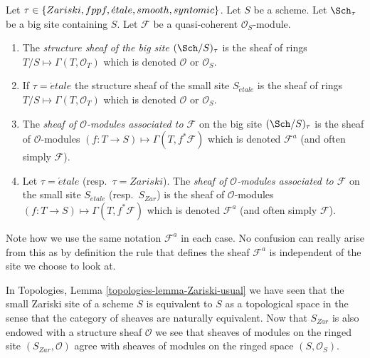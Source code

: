 \begin{definition}
\label{definition-structure-sheaf}
Let $\tau \in \{Zariski, \linebreak[0] fppf, \linebreak[0]
\acute{e}tale, \linebreak[0] smooth, \linebreak[0] syntomic\}$.
Let $S$ be a scheme.
Let $\Sch_\tau$ be a big site containing $S$.
Let $\mathcal{F}$ be a quasi-coherent $\mathcal{O}_S$-module.
\begin{enumerate}
\item The {\it structure sheaf of the big site $(\Sch/S)_\tau$}
is the sheaf of rings $T/S \mapsto \Gamma(T, \mathcal{O}_T)$ which is
denoted $\mathcal{O}$ or $\mathcal{O}_S$.
\item If $\tau = \acute{e}tale$ the structure sheaf of the small site
$S_{\acute{e}tale}$ is the sheaf of rings $T/S \mapsto \Gamma(T, \mathcal{O}_T)$
which is denoted $\mathcal{O}$ or $\mathcal{O}_S$.
\item The {\it sheaf of $\mathcal{O}$-modules associated to
$\mathcal{F}$} on the big site $(\Sch/S)_\tau$
is the sheaf of $\mathcal{O}$-modules
$(f : T \to S) \mapsto \Gamma(T, f^*\mathcal{F})$
which is denoted $\mathcal{F}^a$ (and often simply $\mathcal{F}$).
\item Let $\tau = \acute{e}tale$ (resp.\ $\tau = Zariski$). The
{\it sheaf of $\mathcal{O}$-modules associated to $\mathcal{F}$}
on the small site $S_{\acute{e}tale}$ (resp.\ $S_{Zar}$) is the sheaf of
$\mathcal{O}$-modules $(f : T \to S) \mapsto \Gamma(T, f^*\mathcal{F})$
which is denoted $\mathcal{F}^a$ (and often simply $\mathcal{F}$).
\end{enumerate}
\end{definition}

\noindent
Note how we use the same notation $\mathcal{F}^a$ in each case.
No confusion can really arise from this as by definition the rule
that defines the sheaf $\mathcal{F}^a$ is independent of the site
we choose to look at.

\begin{remark}
\label{remark-Zarsiki-site-space}
In Topologies, Lemma \ref{topologies-lemma-Zariski-usual}
we have seen that the small Zariski site of a scheme $S$ is
equivalent to $S$ as a topological space in the sense that the
category of sheaves are naturally equivalent. Now that $S_{Zar}$
is also endowed with a structure sheaf $\mathcal{O}$ we see
that sheaves of modules on the ringed site $(S_{Zar}, \mathcal{O})$
agree with sheaves of modules on the ringed space $(S, \mathcal{O}_S)$.
\end{remark}

